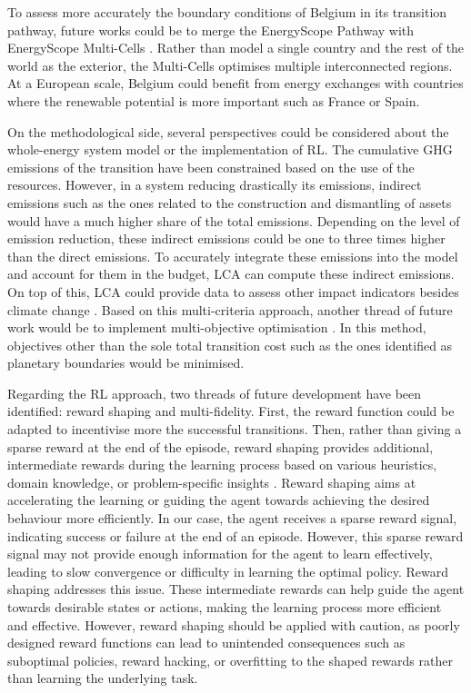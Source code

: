 To assess more accurately the boundary conditions of Belgium in its transition pathway, future works could be to merge the EnergyScope Pathway with EnergyScope Multi-Cells \cite{thiran2023validation}. Rather than model a single country and the rest of the world as the exterior, the Multi-Cells optimises multiple interconnected regions. At a European scale, Belgium could benefit from energy exchanges with countries where the renewable potential is more important such as France or Spain. 

On the methodological side, several perspectives could be considered about the whole-energy system model or the implementation of \gls{RL}. The cumulative \acrfull{GHG} emissions of the transition have been constrained based on the use of the resources. However, in a system reducing drastically its emissions, indirect emissions such as the ones related to the construction and dismantling of assets would have a much higher share of the total emissions. Depending on the level of emission reduction, these indirect emissions could be one to three times higher than the direct emissions. To accurately integrate these emissions into the model and account for them in the  budget, \gls{LCA} can compute these indirect emissions. On top of this, \gls{LCA} could provide data to assess other impact indicators besides climate change \cite{astudillo2018integrating}. Based on this multi-criteria approach, another thread of future work would be to implement multi-objective optimisation \cite{dubois2023multi}. In this method, objectives other than the sole total transition cost such as the ones identified as planetary boundaries \cite{richardson2023earth} would be minimised.

Regarding the \gls{RL} approach, two threads of future development have been identified: reward shaping and multi-fidelity.  First, the reward function could be adapted to incentivise more the successful transitions. Then, rather than giving a sparse reward at the end of the episode, reward shaping provides additional, intermediate rewards during the learning process based on various heuristics, domain knowledge, or problem-specific insights \cite{hu2020learning}. Reward shaping aims at accelerating the learning or guiding the agent towards achieving the desired behaviour more efficiently. In our case, the agent receives a sparse reward signal, indicating success or failure at the end of an episode. However, this sparse reward signal may not provide enough information for the agent to learn effectively, leading to slow convergence or difficulty in learning the optimal policy. Reward shaping addresses this issue. These intermediate rewards can help guide the agent towards desirable states or actions, making the learning process more efficient and effective. However, reward shaping should be applied with caution, as poorly designed reward functions can lead to unintended consequences such as suboptimal policies, reward hacking, or overfitting to the shaped rewards rather than learning the underlying task.  

